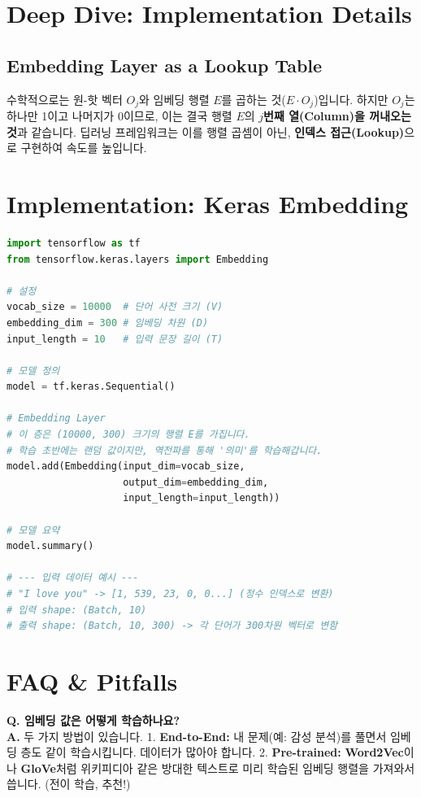 \documentclass[11pt,a4paper]{book}
\theoremstyle{definition}
\begin{document}
\section{Deep Dive: Implementation Details}

\subsection{Embedding Layer as a Lookup Table}
수학적으로는 원-핫 벡터 $O_j$와 임베딩 행렬 $E$를 곱하는 것($E \cdot O_j$)입니다.
하지만 $O_j$는 하나만 1이고 나머지가 0이므로, 이는 결국 행렬 $E$의 \textbf{$j$번째 열(Column)을 꺼내오는 것}과 같습니다.
딥러닝 프레임워크는 이를 행렬 곱셈이 아닌, \textbf{인덱스 접근(Lookup)}으로 구현하여 속도를 높입니다.

\section{Implementation: Keras Embedding}

\begin{lstlisting}[language=Python, caption=Embedding Layer Usage, breaklines=true]
import tensorflow as tf
from tensorflow.keras.layers import Embedding

# 설정
vocab_size = 10000  # 단어 사전 크기 (V)
embedding_dim = 300 # 임베딩 차원 (D)
input_length = 10   # 입력 문장 길이 (T)

# 모델 정의
model = tf.keras.Sequential()

# Embedding Layer
# 이 층은 (10000, 300) 크기의 행렬 E를 가집니다.
# 학습 초반에는 랜덤 값이지만, 역전파를 통해 '의미'를 학습해갑니다.
model.add(Embedding(input_dim=vocab_size, 
                    output_dim=embedding_dim, 
                    input_length=input_length))

# 모델 요약
model.summary()

# --- 입력 데이터 예시 ---
# "I love you" -> [1, 539, 23, 0, 0...] (정수 인덱스로 변환)
# 입력 shape: (Batch, 10)
# 출력 shape: (Batch, 10, 300) -> 각 단어가 300차원 벡터로 변함
\end{lstlisting}

\section{FAQ \& Pitfalls}

\textbf{Q. 임베딩 값은 어떻게 학습하나요?} \\
\textbf{A.} 두 가지 방법이 있습니다.
1. \textbf{End-to-End:} 내 문제(예: 감성 분석)를 풀면서 임베딩 층도 같이 학습시킵니다. 데이터가 많아야 합니다.
2. \textbf{Pre-trained:} \textbf{Word2Vec}이나 \textbf{GloVe}처럼 위키피디아 같은 방대한 텍스트로 미리 학습된 임베딩 행렬을 가져와서 씁니다. (전이 학습, 추천!)
\end{document}
